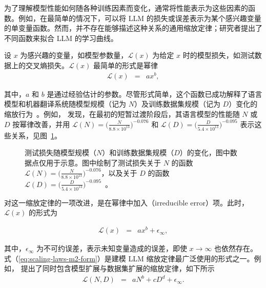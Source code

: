 为了理解模型性能如何随各种训练因素而变化，通常将性能表示为这些因素的函数。例如，在最简单的情况下，可以将 LLM 的损失或误差表示为某个感兴趣变量的单变量函数。然而，并不存在能够描述这种关系的通用缩放定律；研究者提出了不同函数来拟合 LLM 的学习曲线。

设 $x$ 为感兴趣的变量，如模型参数量，$\mathcal{L}(x)$ 为给定 $x$ 时的模型损失，如测试数据上的交叉熵损失。$\mathcal{L}(x)$ 最简单的形式是幂律
\begin{eqnarray}
\mathcal{L}(x) & = & ax^b,
\end{eqnarray}

\noindent 其中，$a$ 和 $b$ 是通过经验估计的参数。尽管形式简单，这个函数已成功解释了语言模型和机器翻译系统随模型规模（记为 $N$）及训练数据集规模（记为 $D$）变化的缩放行为~\cite{gordon-etal:2021data,hestness-etal:2017deep}。例如，\citet{kaplan-etal:2020scaling} 发现，在最初的短暂过渡阶段后，其语言模型的性能随 $N$ 或 $D$ 按幂律改善，并用 $\mathcal{L}(N) = \big( \frac{N}{8.8 \times 10^{13}} \big)^{-0.076}$ 和 $\mathcal{L}(D) = \big( \frac{D}{5.4 \times 10^{13}} \big)^{-0.095}$ 表示这些关系，见图~\ref{fig:power-law-scaling-for-model-size-and-dataset-size}。

\begin{figure}[!t]
\centering

\caption{测试损失随模型规模（$N$）和训练数据集规模（$D$）的变化，图中数据点仅用于示意。图中绘制了测试损失关于 $N$ 的函数 $\mathcal{L}(N) = \big( \frac{N}{8.8 \times 10^{13}} \big)^{-0.076}$，以及关于 $D$ 的函数 $\mathcal{L}(D) = \big( \frac{D}{5.4 \times 10^{13}} \big)^{-0.095}$~\cite{kaplan-etal:2020scaling}。}
\label{fig:power-law-scaling-for-model-size-and-dataset-size}
\end{figure}

对这一缩放定律的一项改进，是在幂律中加入（irreducible error）项。此时，$\mathcal{L}(x)$ 的形式为

\begin{eqnarray}
\mathcal{L}(x) & = & ax^b + \epsilon_{\infty} \label{eq:scaling-laws-m2-form},
\end{eqnarray}

\noindent 其中，$\epsilon_{\infty}$ 为不可约误差，表示未知变量造成的误差，即使 $x \to \infty$ 也依然存在。式（\ref{eq:scaling-laws-m2-form}）是建模 LLM 缩放定律最广泛使用的形式之一。例如，\citet{rosenfeld-etal:2020constructive} 提出了同时包含模型扩展与数据集扩展的缩放定律，如下所示
\begin{eqnarray}
\mathcal{L}(N,D) & = & aN^b + cD^d + \epsilon_{\infty}.
\end{eqnarray}


